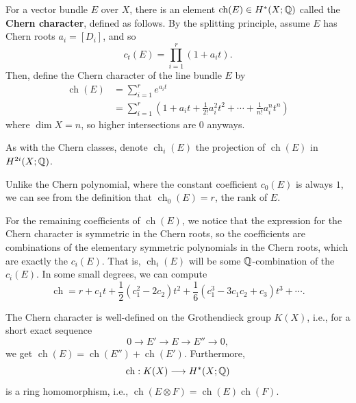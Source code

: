 \documentclass[12pt]{article}
\DeclareMathOperator{\chern}{ch}
\begin{document}
\begin{defn}
    For a vector bundle $E$ over $X$, there is an element $\chern(E)\in H^*(X;\Q)$ called the \textbf{Chern character}, defined as follows. By the splitting principle, assume $E$ has Chern roots $a_i=[D_i]$, and so
    \[c_t(E)=\prod_{i=1}^r (1+a_i t).\]
    Then, define the Chern character of the line bundle $E$ by
    \begin{align*}
        \chern(E) &= \sum_{i=1}^r e^{a_i t}\\
        &= \sum_{i=1}^r (1 + a_i t + \frac{1}{2!} a_i^2 t^2 + \cdots + \frac{1}{n!} a_i^n t^n)
    \end{align*}
    where $\dim X = n$, so higher intersections are 0 anyways.

    As with the Chern classes, denote $\chern_i(E)$ the projection of $\chern(E)$ in $H^{2i}(X;\mathbb{Q})$.
\end{defn}

\begin{rmk}
    Unlike the Chern polynomial, where the constant coefficient $c_0(E)$ is always $1$, we can see from the definition that $\chern_0(E) = r$, the rank of $E$.
    
    For the remaining coefficients of $\chern(E)$,  we notice that the expression for the Chern character is symmetric in the Chern roots, so the coefficients are combinations of the elementary symmetric polynomials in the Chern roots, which are exactly the $c_i(E)$. That is, $\chern_i(E)$ will be some $\mathbb{Q}$-combination of the $c_i(E)$. In some small degrees, we can compute
    \[\chern = r + c_1 t + \frac{1}{2}(c_1^2 - 2 c_2)t^2 + \frac{1}{6}(c_1^3 -3c_1c_2 + c_3)t^3 + \cdots.\]
\end{rmk}


\begin{prop}
    The Chern character is well-defined on the Grothendieck group $K(X)$, i.e., for a short exact sequence
    \[0\to E' \to E \to E'' \to 0,\]
    we get $\chern(E) = \chern(E'') + \chern(E')$. Furthermore,
    \[\chern: K(X) \longrightarrow H^*(X;\Q)\]
    is a ring homomorphism, i.e., $\chern(E\otimes F)=\chern(E)\chern(F)$.
\end{prop}
\end{document}
